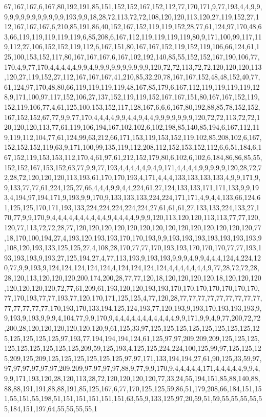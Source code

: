 67,167,167,6,167,80,192,191,85,151,152,152,167,152,112,77,170,171,9,77,193,4,4,9,9,9,9,9,9,9,9,9,9,9,9,9,193,9,9,18,28,72,113,72,72,108,120,120,113,120,27,119,152,27,112,167,167,167,6,210,85,191,86,40,152,167,152,119,119,152,28,77,61,124,97,170,48,63,66,119,119,119,119,119,6,85,208,6,167,112,119,119,119,119,80,9,171,100,99,117,119,112,27,106,152,152,119,112,6,167,151,80,167,167,152,119,152,119,106,66,124,61,125,100,153,152,117,80,167,167,167,6,167,102,192,140,85,55,152,152,167,190,106,77,170,4,9,77,170,4,4,4,4,4,9,9,4,9,9,9,9,9,9,9,9,9,9,120,72,72,113,72,72,120,120,120,113,120,27,119,152,27,112,167,167,167,41,210,85,32,20,78,167,167,152,48,48,152,40,77,61,124,97,170,48,80,66,119,119,119,119,48,167,85,179,6,167,112,119,119,119,119,128,9,171,100,97,117,152,106,27,137,152,119,119,152,167,167,151,80,167,167,152,119,152,119,106,77,4,61,125,100,153,152,117,128,167,6,6,6,167,80,192,88,85,78,152,152,167,152,152,67,77,9,9,77,170,4,4,4,4,9,9,4,4,9,4,4,9,9,9,9,9,9,9,120,72,72,113,72,72,120,120,120,113,77,61,119,106,194,167,102,102,6,102,198,85,140,85,194,6,167,112,119,119,112,104,77,61,124,99,63,212,66,171,153,119,153,152,119,102,85,208,102,6,167,152,152,152,119,63,9,171,100,99,135,119,112,208,112,152,153,152,112,6,6,51,184,6,167,152,119,153,153,112,170,4,61,97,61,212,152,179,80,6,102,6,102,6,184,86,86,85,55,152,152,167,153,152,63,77,9,9,77,193,4,4,4,4,4,9,4,9,171,4,4,4,4,9,9,9,9,9,120,28,72,72,28,72,120,120,120,113,193,61,170,170,193,4,171,4,4,4,133,133,133,133,4,9,9,171,9,9,133,77,77,61,224,125,27,66,4,4,4,9,9,4,4,224,61,27,124,133,133,171,171,133,9,9,193,4,194,97,194,171,9,193,9,9,170,9,133,133,133,224,224,171,171,4,9,4,4,133,66,124,61,125,125,170,171,193,133,224,224,224,224,224,27,61,61,61,27,133,133,224,133,27,170,77,9,9,170,9,4,4,4,4,4,4,4,4,4,4,9,4,4,4,4,9,9,9,120,113,120,120,113,113,77,77,120,120,77,113,72,72,28,77,120,120,120,120,120,120,120,120,120,120,120,120,120,120,77,18,170,100,194,27,4,193,120,193,193,170,170,193,9,9,193,193,193,193,193,193,193,9,108,120,193,133,125,125,27,4,108,28,170,77,77,170,193,193,170,170,170,77,77,193,193,193,193,9,193,27,125,194,27,4,77,113,193,9,193,193,9,9,9,4,9,9,4,4,4,124,4,224,120,77,9,9,193,9,124,124,124,124,124,4,124,124,124,124,4,4,4,4,4,4,4,9,77,28,72,72,28,28,120,113,120,120,120,200,174,200,28,77,77,120,18,120,120,120,120,18,120,120,120,120,120,120,120,72,77,61,209,61,193,120,120,193,193,170,170,170,170,170,170,170,77,170,193,77,77,193,77,120,170,171,125,125,4,77,120,28,77,77,77,77,77,77,77,77,77,77,77,77,77,77,170,193,170,133,194,125,124,193,77,120,193,9,193,170,193,193,193,9,9,193,9,193,9,9,9,4,104,77,9,9,170,9,4,4,4,4,4,4,4,4,4,4,4,9,9,171,9,9,4,9,77,200,72,72,200,28,120,120,120,120,120,120,9,61,125,33,97,125,125,125,125,125,125,125,125,125,125,125,125,125,97,193,77,194,194,194,124,61,125,97,97,209,209,209,125,125,125,125,125,125,125,125,125,209,59,125,193,4,125,125,224,224,100,125,99,97,125,125,125,209,125,209,125,125,125,125,125,125,97,97,171,133,194,194,27,61,90,125,33,59,97,97,97,97,97,97,97,209,209,97,97,97,97,88,9,77,9,9,170,9,4,4,4,4,4,171,4,4,4,4,4,9,9,4,9,9,171,193,120,28,120,113,28,72,120,120,120,120,77,33,24,55,194,151,85,88,140,88,88,88,191,191,88,88,191,85,125,167,6,77,170,125,125,59,86,51,179,208,66,184,151,151,55,151,55,198,51,151,151,151,151,151,63,55,9,133,125,97,20,59,51,59,55,55,55,55,55,184,151,197,64,55,55,55,55,1